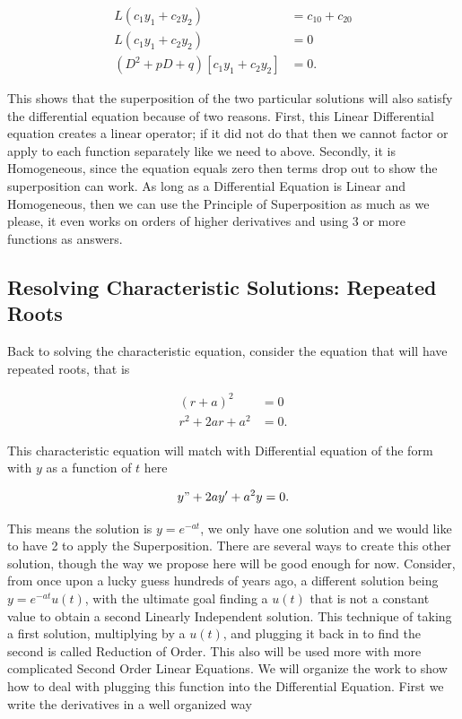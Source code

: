\documentclass[12pt]{article}
\begin{document}
\begin{align*}
    L(c_1y_1+c_2y_2) &= c_10 + c_20 \\
    L(c_1y_1+c_2y_2) &= 0 \\
    (D^2+pD+q)[c_1y_1+c_2y_2] &= 0. 
\end{align*}

This shows that the superposition of the two particular solutions will also satisfy the differential equation because of two reasons. First, this Linear Differential equation creates a linear operator; if it did not do that then we cannot factor or apply to each function separately like we need to above. Secondly, it is Homogeneous, since the equation equals zero then terms drop out to show the superposition can work. As long as a Differential Equation is Linear and Homogeneous, then we can use the Principle of Superposition as much as we please, it even works on orders of higher derivatives and using $3$ or more functions as answers.

\subsection{Resolving Characteristic Solutions: Repeated Roots}

Back to solving the characteristic equation, consider the equation that will have repeated roots, that is

\begin{align*}
    (r+a)^2 &= 0 \\
    r^2+2ar+a^2 &= 0.
\end{align*}

This characteristic equation will match with Differential equation of the form with $y$ as a function of $t$ here

\begin{equation*}
    y"+2ay'+a^2y = 0.
\end{equation*}

This means the solution is $y=e^{-at}$, we only have one solution and we would like to have 2 to apply the Superposition. There are several ways to create this other solution, though the way we propose here will be good enough for now. Consider, from once upon a lucky guess hundreds of years ago, a different solution being $y=e^{-at}u(t)$, with the ultimate goal finding a $u(t)$ that is not a constant value to obtain a second Linearly Independent solution. This technique of taking a first solution, multiplying by a $u(t)$, and plugging it back in to find the second is called Reduction of Order. This also will be used more with more complicated Second Order Linear Equations. We will organize the work to show how to deal with plugging this function into the Differential Equation. First we write the derivatives in a well organized way
\end{document}
